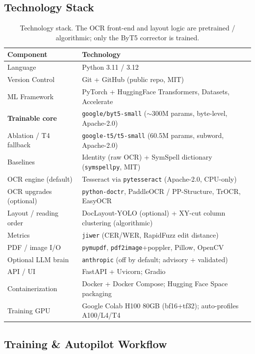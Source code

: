 \documentclass[12pt,a4paper]{article}
\begin{document}
\subsection{Technology Stack}

\begin{table}[H]
\centering
\caption{Technology stack. The OCR front-end and layout logic are pretrained / algorithmic; only the ByT5 corrector is trained.}
\small
\begin{tabularx}{\linewidth}{@{} l L @{}}
\toprule
\textbf{Component} & \textbf{Technology} \\
\midrule
Language & Python 3.11 / 3.12 \\
Version Control & Git + GitHub (public repo, MIT) \\
ML Framework & PyTorch + HuggingFace Transformers, Datasets, Accelerate \\
\textbf{Trainable core} & \texttt{google/byt5-small} ($\sim$300M params, byte-level, Apache-2.0) \\
Ablation / T4 fallback & \texttt{google-t5/t5-small} (60.5M params, subword, Apache-2.0) \\
Baselines & Identity (raw OCR) + SymSpell dictionary (\texttt{symspellpy}, MIT) \\
OCR engine (default) & Tesseract via \texttt{pytesseract} (Apache-2.0, CPU-only) \\
OCR upgrades (optional) & \texttt{python-doctr}, PaddleOCR / PP-Structure, TrOCR, EasyOCR \\
Layout / reading order & DocLayout-YOLO (optional) + XY-cut column clustering (algorithmic) \\
Metrics & \texttt{jiwer} (CER/WER, RapidFuzz edit distance) \\
PDF / image I/O & \texttt{pymupdf}, \texttt{pdf2image}+poppler, Pillow, OpenCV \\
Optional LLM brain & \texttt{anthropic} (off by default; advisory + validated) \\
API / UI & FastAPI + Uvicorn; Gradio \\
Containerization & Docker + Docker Compose; Hugging Face Space packaging \\
Training GPU & Google Colab H100 80GB (bf16+tf32); auto-profiles A100/L4/T4 \\
\bottomrule
\end{tabularx}
\end{table}

\subsection{Training \& Autopilot Workflow}
\label{subsec:workflow}
\end{document}
